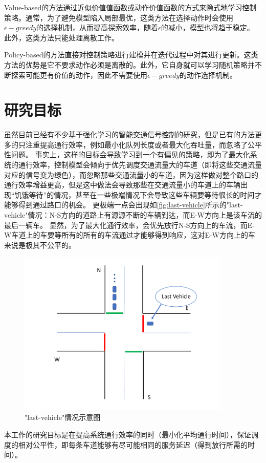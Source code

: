 Value-based的方法通过近似价值值函数或动作价值函数的方式来隐式地学习控制策略。通常，为了避免模型陷入局部最优，这类方法在选择动作时会使用$\epsilon-greedy$的选择机制，从而提高探索效率，随着$\epsilon$的减小，模型也将趋于稳定。
此外，这类方法只能处理离散工作。

Policy-based的方法直接对控制策略进行建模并在迭代过程中对其进行更新。这类方法的优势是它不要求动作必须是离散的。此外，它自身就可以学习随机策略并不断探索可能更有价值的动作，因此不需要使用$\epsilon-greedy$的动作选择机制。

\section{研究目标}
虽然目前已经有不少基于强化学习的智能交通信号控制的研究，但是已有的方法更多的只注重提高通行效率，例如最小化队列长度或者最大化吞吐量，而忽略了公平性问题。
事实上，这样的目标会导致学习到一个有偏见的策略，即为了最大化系统的通行效率，控制模型会倾向于优先调度交通流量大的车道（即将这些交通流量对应的信号变为绿色），而忽略那些交通流量小的车道，因为这样做对整个路口的通行效率增益更高，但是这中做法会导致那些在交通流量小的车道上的车辆出现“饥饿等待”的情况，甚至在一些极端情况下会导致这些车辆要等待很长的时间才能够得到通过路口的机会。 更极端一点会出现如\autoref{fig:last-vehicle}所示的"last-vehicle"情况：N-S方向的道路上有源源不断的车辆到达，而E-W方向上是该车流的最后一辆车。
显然，为了最大化通行效率，会优先放行N-S方向上的车流，而E-W车道上的车要等所有的所有的车流通过才能够得到响应，这对E-W方向上的车来说是极其不公平的。

\begin{figure}[t]
  \includegraphics[width=0.9\textwidth]{fig/lastvehicle.pdf}
  \caption{"last-vehicle"情况示意图}
  \label{fig:last-vehicle}
\end{figure}
本工作的研究目标是在提高系统通行效率的同时（最小化平均通行时间），保证调度的相对公平性，即每条车道能够有尽可能相同的服务延迟（得到放行所需的时间）。

